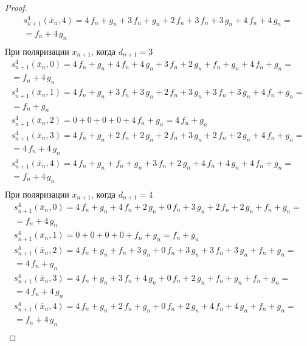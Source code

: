 \documentclass[bibliography=totoc, a4paper, 14pt]{extarticle}
\begin{document}
\begin{proof}
$$\begin{array}{l}
s_{n+1}^4(\bar{x}_n, 4) = 4\,f_n + g_n + 3\,f_n + g_n + 2\,f_n + 3\,f_n + 3\,g_n + 4\,f_n + 4\,g_n =\\
= f_n + 4\,g_n \\
\end{array}$$
При поляризации $x_{n+1}$, когда $d_{n+1} = 3$
$$\begin{array}{l}
s_{n+1}^4(\bar{x}_n, 0) = 4\,f_n + g_n + 4\,f_n + 4\,g_n + 3\,f_n + 2\,g_n + f_n + g_n + 4\,f_n + g_n =\\
= f_n + 4\,g_n \\
s_{n+1}^4(\bar{x}_n, 1) = 4\,f_n + g_n + 3\,f_n + 3\,g_n + 2\,f_n + 3\,g_n + 3\,f_n + 3\,g_n + 4\,f_n + g_n =\\
= f_n + g_n \\
s_{n+1}^4(\bar{x}_n, 2) = 0 + 0 + 0 + 0 + 4\,f_n + g_n = 4\,f_n + g_n \\
s_{n+1}^4(\bar{x}_n, 3) = 4\,f_n + g_n + 2\,f_n + 2\,g_n + 2\,f_n + 3\,g_n + 2\,f_n + 2\,g_n + 4\,f_n + g_n =\\
= 4\,f_n + 4\,g_n \\
s_{n+1}^4(\bar{x}_n, 4) = 4\,f_n + g_n + f_n + g_n + 3\,f_n + 2\,g_n + 4\,f_n + 4\,g_n + 4\,f_n + g_n =\\
= f_n + 4\,g_n \\
\end{array}$$
При поляризации $x_{n+1}$, когда $d_{n+1} = 4$
$$\begin{array}{l}
s_{n+1}^4(\bar{x}_n, 0) = 4\,f_n + g_n + 4\,f_n + 2\,g_n + 0\,f_n + 3\,g_n + 2\,f_n + 2\,g_n + f_n + g_n =\\
= f_n + 4\,g_n \\
s_{n+1}^4(\bar{x}_n, 1) = 0 + 0 + 0 + 0 + f_n + g_n = f_n + g_n \\
s_{n+1}^4(\bar{x}_n, 2) = 4\,f_n + g_n + f_n + 3\,g_n + 0\,f_n + 3\,g_n + 3\,f_n + 3\,g_n + f_n + g_n =\\
= 4\,f_n + g_n \\
s_{n+1}^4(\bar{x}_n, 3) = 4\,f_n + g_n + 3\,f_n + 4\,g_n + 0\,f_n + 2\,g_n + f_n + g_n + f_n + g_n =\\
= 4\,f_n + 4\,g_n \\
s_{n+1}^4(\bar{x}_n, 4) = 4\,f_n + g_n + 2\,f_n + g_n + 0\,f_n + 2\,g_n + 4\,f_n + 4\,g_n + f_n + g_n =\\
= f_n + 4\,g_n \\
\end{array}$$

\end{proof}
\end{document}
